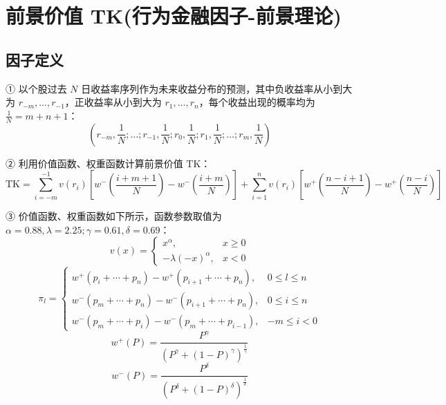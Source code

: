 \documentclass{article}
\begin{document}
\section{前景价值 TK(行为金融因子-前景理论)}

\subsection{因子定义}

① 以个股过去 \( N \) 日收益率序列作为未来收益分布的预测，其中负收益率从小到大为 \( r_{-m}, \ldots, r_{-1} \)，正收益率从小到大为 \( r_1, \ldots, r_n \)，每个收益出现的概率均为 \( \frac{1}{N} = m + n + 1 \)：
\begin{equation}
    (r_{-m}, \frac{1}{N}; \ldots; r_{-1}, \frac{1}{N}; r_0, \frac{1}{N}; r_1, \frac{1}{N}; \ldots; r_m, \frac{1}{N})
\end{equation}

② 利用价值函数、权重函数计算前景价值 \( \mathrm{TK} \)：
\begin{equation}
    \mathrm{TK} = \sum_{i=-m}^{-1} v(r_i)\left[ w^-\left(\frac{i + m + 1}{N}\right) - w^-\left(\frac{i + m}{N}\right) \right] + \sum_{i=1}^{n} v(r_i)\left[ w^+\left(\frac{n - i + 1}{N}\right) - w^+\left(\frac{n - i}{N}\right) \right]
\end{equation}

③ 价值函数、权重函数如下所示，函数参数取值为 \( \alpha = 0.88, \lambda = 2.25; \gamma = 0.61, \delta = 0.69 \)：
\begin{equation}
    v(x) =
    \begin{cases} 
        x^\alpha, & x \geq 0 \\ 
        -\lambda(-x)^\alpha, & x < 0 
    \end{cases}
\end{equation}
\begin{equation}
    \pi_l =
    \begin{cases} 
        w^+(p_i + \cdots + p_n) - w^+(p_{i+1} + \cdots + p_n), & 0 \leq l \leq n \\ 
        w^-(p_m + \cdots + p_n) - w^-(p_{i+1} + \cdots + p_n), & 0 \leq i \leq n \\ 
        w^-(p_m + \cdots + p_i) - w^-(p_m + \cdots + p_{i-1}), & -m \leq i < 0 
    \end{cases}
\end{equation}
\begin{equation}
    w^+(P) = \frac{P^\gamma}{(P^\gamma + (1 - P)^\gamma)^{\frac{1}{\gamma}}}
\end{equation}
\begin{equation}
    w^-(P) = \frac{P^\delta}{(P^\delta + (1 - P)^\delta)^{\frac{1}{\delta}}}
\end{equation}
\end{document}
